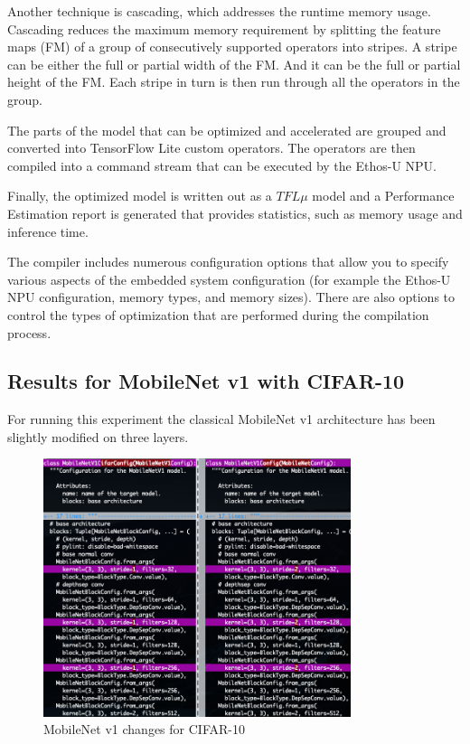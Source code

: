Another technique is cascading, which addresses the runtime memory usage.
Cascading reduces the maximum memory requirement by splitting the feature maps
(FM) of a group of consecutively supported operators into stripes. A stripe can
be either the full or partial width of the FM\@. And it can be the full or
partial height of the FM\@. Each stripe in turn is then run through all the
operators in the group.

The parts of the model that can be optimized and accelerated are grouped and
converted into TensorFlow Lite custom operators. The operators are then
compiled into a command stream that can be executed by the Ethos-U NPU\@.

Finally, the optimized model is written out as a $TFL\mu$ model and a
Performance Estimation report is generated that provides statistics, such as
memory usage and inference time.

The compiler includes numerous configuration options that allow you to specify
various aspects of the embedded system configuration (for example the Ethos-U
NPU configuration, memory types, and memory sizes). There are also options to
control the types of optimization that are performed during the compilation
process.\cite{vela_compiler}

\subsection{Results for MobileNet v1 with CIFAR-10}
For running this experiment the classical MobileNet v1 architecture has been
slightly modified on three layers.

\begin{figure}[ht]
    \includegraphics[width=9cm]{images/results/mobilenet_cifar10_diff.png}
    \centering
    \caption{MobileNet v1 changes for CIFAR-10}\label{fig:mobilenet_cifar10_diff}
\end{figure}

